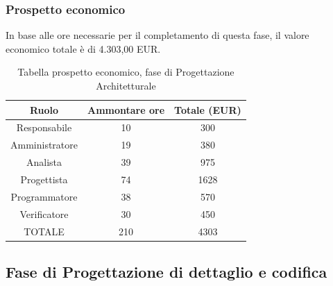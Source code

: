 \subsubsection{Prospetto economico}
In base alle ore necessarie per il completamento di questa fase, il valore economico totale è di 4.303,00 EUR.
\begin{table}[h]
	\caption{Tabella prospetto economico, fase di Progettazione Architetturale}  
\begin{center}
\begin{tabular}{ |c|c|c|  }
 \hline
 Ruolo 		& Ammontare ore 	& Totale (EUR)\\
 	\hline
 \hline
 	Responsabile	& 10 	& 300\\
	Amministratore	& 19		& 380\\
	Analista		& 39 	& 975\\
	Progettista		& 74		& 1628\\
	Programmatore	& 38		& 570\\
	Verificatore	& 30 	& 450\\
 \hline\hline
 TOTALE		& 210		& 4303\\
  \hline
\end{tabular}
\end{center}
\end{table}
\newpage
\subsection{Fase di Progettazione di dettaglio e codifica}
